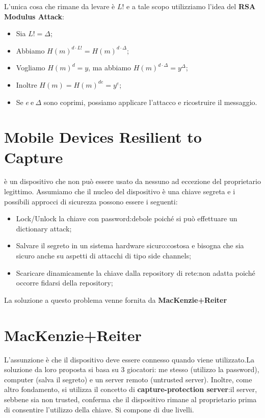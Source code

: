 \documentclass{book}
\begin{document}
L'unica cosa che rimane da levare è \(L! \) e a tale scopo utilizziamo l'idea del \textbf{RSA Modulus Attack}:\begin{itemize}
	\item Sia \(L! =\Delta \);
	\item Abbiamo \({H(m)}^{d\cdot L!}={H(m)}^{d\cdot \Delta}\);
	\item Vogliamo \({H(m)}^{d}=y\), ma abbiamo \({H(m)}^{d\cdot \Delta }=y^{\Delta }\);
	\item Inoltre \(H(m)={H(m)}^{de}=y^{e}\);
	\item Se \(e\ \text{e}\ \Delta \) sono coprimi, possiamo applicare l'attacco e ricostruire il messaggio.
\end{itemize}
\section{Mobile Devices Resilient to Capture}
è un dispositivo che non può essere usato da nessuno ad eccezione del proprietario legittimo\@. Assumiamo che il nucleo del dispositivo è una chiave segreta e i possibili approcci di sicurezza possono essere i seguenti:\begin{itemize}
	\item Lock/Unlock la chiave con password:\@soluzione debole poiché si può effettuare un dictionary attack;
	\item Salvare il segreto in un sistema hardware sicuro:\@soluzione costosa e bisogna che sia sicuro anche su aspetti di attacchi di tipo side channels;
	\item Scaricare dinamicamente la chiave dalla repository di rete:\@soluzione non adatta poiché occorre fidarsi della repository;
\end{itemize}
La soluzione a questo problema venne fornita da \textbf{MacKenzie+Reiter}
\section{MacKenzie+Reiter}
L'assunzione è che il dispositivo deve essere connesso quando viene utilizzato\@.La soluzione da loro proposta si basa su 3 giocatori: me stesso (utilizzo la password), computer (salva il segreto) e un server remoto (untrusted server)\@. Inoltre, come altro fondamento, si utilizza il concetto di \textbf{capture-protection server}:il server, sebbene sia non trusted, conferma che il dispositivo rimane al proprietario prima di consentire l'utilizzo della chiave\@. Si compone di due livelli.
\end{document}
